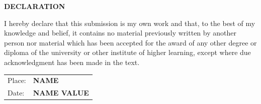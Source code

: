 \documentclass[a4paper,12pt]{report}
\begin{document}



\begin{titlepage}
    {\scshape \centering \Large \bfseries DECLARATION \par}
    \vspace{1.5cm}
    { I hereby declare that this submission is my own work and that, to the best of my knowledge and belief, it contains no material previously written by another person nor material which has been accepted for the award of any other degree or diploma of the university or other institute of higher learning, except where due acknowledgment has been made in the text.}
    \vspace{2cm}
    \vfill
    \begin{tabular}{lp{}}
        Place: & \hspace{7cm} \textbf{NAME} \\
        Date: & \hspace{7cm} \textbf{NAME VALUE} \\
    \end{tabular}
\end{titlepage}
\end{document}
